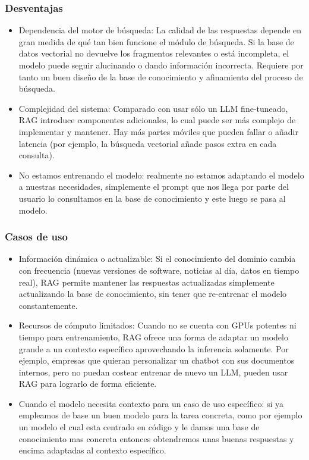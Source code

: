 \subsubsection{Desventajas}

\begin{itemize}
    \item Dependencia del motor de búsqueda: La calidad de las respuestas depende en gran medida de qué tan bien funcione el módulo de búsqueda. Si la base de datos vectorial no devuelve los fragmentos relevantes o está incompleta, el modelo puede seguir alucinando o dando información incorrecta. Requiere por tanto un buen diseño de la base de conocimiento y afinamiento del proceso de búsqueda.

    \item Complejidad del sistema: Comparado con usar sólo un LLM fine-tuneado, RAG introduce componentes adicionales, lo cual puede ser más complejo de implementar y mantener. Hay más partes móviles que pueden fallar o añadir latencia (por ejemplo, la búsqueda vectorial añade pasos extra en cada consulta).

    \item No estamos entrenando el modelo: realmente no estamos adaptando el modelo a nuestras necesidades, simplemente el prompt que nos llega por parte del usuario lo consultamos en la base de conocimiento y este luego se pasa al modelo.
\end{itemize}

\subsubsection{Casos de uso}
\begin{itemize}
    \item Información dinámica o actualizable: Si el conocimiento del dominio cambia con frecuencia (nuevas versiones de software, noticias al día, datos en tiempo real), RAG permite mantener las respuestas actualizadas simplemente actualizando la base de conocimiento, sin tener que re-entrenar el modelo constantemente.

    \item Recursos de cómputo limitados: Cuando no se cuenta con GPUs potentes ni tiempo para entrenamiento, RAG ofrece una forma de adaptar un modelo grande a un contexto específico aprovechando la inferencia solamente. Por ejemplo, empresas que quieran personalizar un chatbot con sus documentos internos, pero no puedan costear entrenar de nuevo un LLM, pueden usar RAG para lograrlo de forma eficiente.

    \item Cuando el modelo necesita contexto para un caso de uso específico: si ya empleamos de base un buen modelo para la tarea concreta, como por ejemplo un modelo el cual esta centrado en código y le damos una base de conocimiento mas concreta entonces obtendremos unas buenas respuestas y encima adaptadas al contexto específico.
\end{itemize}

